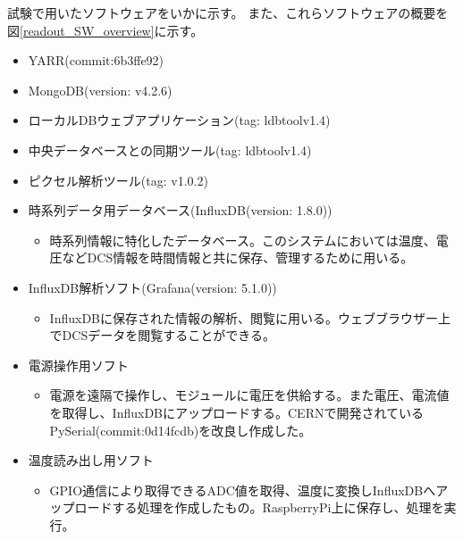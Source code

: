 試験で用いたソフトウェアをいかに示す。
また、これらソフトウェアの概要を図\ref{readout_SW_overview}に示す。
\begin{itemize}
  \item YARR(commit:6b3ffe92)
  \item MongoDB(version: v4.2.6)
  \item ローカルDBウェブアプリケーション(tag: ldbtoolv1.4)
  \item 中央データベースとの同期ツール(tag: ldbtoolv1.4)
  \item ピクセル解析ツール(tag: v1.0.2)
  \item 時系列データ用データベース(InfluxDB\cite{5-6}(version: 1.8.0))
    \begin{itemize}
      \item 時系列情報に特化したデータベース。このシステムにおいては温度、電圧などDCS情報を時間情報と共に保存、管理するために用いる。
    \end{itemize}
  \item InfluxDB解析ソフト(Grafana\cite{5-7}(version: 5.1.0))
    \begin{itemize}
      \item InfluxDBに保存された情報の解析、閲覧に用いる。ウェブブラウザー上でDCSデータを閲覧することができる。
    \end{itemize}
  \item 電源操作用ソフト
    \begin{itemize}
      \item 電源を遠隔で操作し、モジュールに電圧を供給する。また電圧、電流値を取得し、InfluxDBにアップロードする。CERNで開発されているPySerial\cite{5-8}(commit:0d14fcdb)を改良し作成した。
    \end{itemize}
  \item 温度読み出し用ソフト
    \begin{itemize}
      \item GPIO通信により取得できるADC値を取得、温度に変換しInfluxDBへアップロードする処理を作成したもの。RaspberryPi上に保存し、処理を実行。
    \end{itemize}
\end{itemize}

